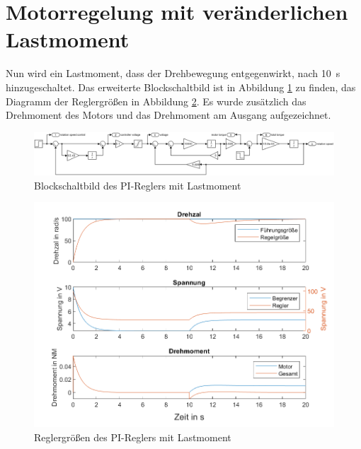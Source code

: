 \documentclass[
    paper=a4,
    fontsize=10pt,
    DIV=12,
    oneside,
]{scrartcl}
\begin{document}
\section{Motorregelung mit veränderlichen Lastmoment}
    Nun wird ein Lastmoment, dass der Drehbewegung entgegenwirkt, nach \SI{10}{\second} hinzugeschaltet. Das erweiterte Blockschaltbild ist in Abbildung \ref{fig:blockPiControllerLoad} zu finden, das Diagramm der Reglergrößen in Abbildung \ref{fig:graphPiControllerload}. Es wurde zusätzlich das Drehmoment des Motors und das Drehmoment am Ausgang aufgezeichnet.

    \begin{figure}[hbt]
        \centering
        \includegraphics[width=1.7\imagewidth]{../versuch3/blockPiControllerLoad}
        \caption{Blockschaltbild des PI-Reglers mit Lastmoment}
        \label{fig:blockPiControllerLoad}
    \end{figure}

    \begin{figure}[hbt]
        \centering
        \includegraphics[width=\imagewidth]{../versuch3/graphPiControllerLoad}
        \caption{Reglergrößen des PI-Reglers mit Lastmoment}
        \label{fig:graphPiControllerload}
    \end{figure}  

\end{document}
